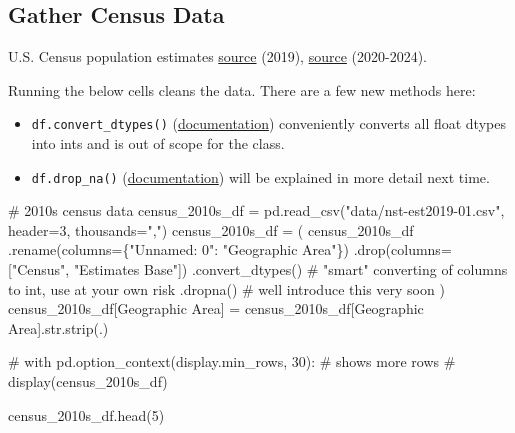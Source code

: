 \documentclass[
  letterpaper,
  DIV=11,
  numbers=noendperiod]{scrreprt}
\newenvironment{Shaded}{\begin{snugshade}}{\end{snugshade}}
\newcommand{\BuiltInTok}[1]{\textcolor[rgb]{0.00,0.23,0.31}{#1}}
\newcommand{\CommentTok}[1]{\textcolor[rgb]{0.37,0.37,0.37}{#1}}
\newcommand{\DecValTok}[1]{\textcolor[rgb]{0.68,0.00,0.00}{#1}}
\newcommand{\NormalTok}[1]{\textcolor[rgb]{0.00,0.23,0.31}{#1}}
\newcommand{\OperatorTok}[1]{\textcolor[rgb]{0.37,0.37,0.37}{#1}}
\newcommand{\StringTok}[1]{\textcolor[rgb]{0.13,0.47,0.30}{#1}}
\providecommand{\tightlist}{%
  \setlength{\itemsep}{0pt}\setlength{\parskip}{0pt}}\usepackage{longtable,booktabs,array}
\begin{document}
\subsection{Gather Census Data}\label{gather-census-data}

U.S. Census population estimates
\href{https://www.census.gov/data/tables/time-series/demo/popest/2010s-state-total.html}{source}
(2019),
\href{https://www.census.gov/data/tables/time-series/demo/popest/2020s-state-total.html}{source}
(2020-2024).

Running the below cells cleans the data. There are a few new methods
here:

\begin{itemize}
\tightlist
\item
  \texttt{df.convert\_dtypes()}
  (\href{https://pandas.pydata.org/docs/reference/api/pandas.DataFrame.convert_dtypes.html}{documentation})
  conveniently converts all float dtypes into ints and is out of scope
  for the class.
\item
  \texttt{df.drop\_na()}
  (\href{https://pandas.pydata.org/docs/reference/api/pandas.DataFrame.dropna.html}{documentation})
  will be explained in more detail next time.
\end{itemize}

\begin{Shaded}
\begin{Highlighting}[]
\CommentTok{\# 2010s census data}
\NormalTok{census\_2010s\_df }\OperatorTok{=}\NormalTok{ pd.read\_csv(}\StringTok{"data/nst{-}est2019{-}01.csv"}\NormalTok{, header}\OperatorTok{=}\DecValTok{3}\NormalTok{, thousands}\OperatorTok{=}\StringTok{","}\NormalTok{)}
\NormalTok{census\_2010s\_df }\OperatorTok{=}\NormalTok{ (}
\NormalTok{    census\_2010s\_df}
\NormalTok{    .rename(columns}\OperatorTok{=}\NormalTok{\{}\StringTok{"Unnamed: 0"}\NormalTok{: }\StringTok{"Geographic Area"}\NormalTok{\})}
\NormalTok{    .drop(columns}\OperatorTok{=}\NormalTok{[}\StringTok{"Census"}\NormalTok{, }\StringTok{"Estimates Base"}\NormalTok{])}
\NormalTok{    .convert\_dtypes() }\CommentTok{\# "smart" converting of columns to int, use at your own risk}
\NormalTok{    .dropna()  }\CommentTok{\# we\textquotesingle{}ll introduce this very soon}
\NormalTok{)}
\NormalTok{census\_2010s\_df[}\StringTok{\textquotesingle{}Geographic Area\textquotesingle{}}\NormalTok{] }\OperatorTok{=}\NormalTok{ census\_2010s\_df[}\StringTok{\textquotesingle{}Geographic Area\textquotesingle{}}\NormalTok{].}\BuiltInTok{str}\NormalTok{.strip(}\StringTok{\textquotesingle{}.\textquotesingle{}}\NormalTok{)}

\CommentTok{\# with pd.option\_context(\textquotesingle{}display.min\_rows\textquotesingle{}, 30): \# shows more rows}
\CommentTok{\#     display(census\_2010s\_df)}
    
\NormalTok{census\_2010s\_df.head(}\DecValTok{5}\NormalTok{)}
\end{Highlighting}
\end{Shaded}
\end{document}
